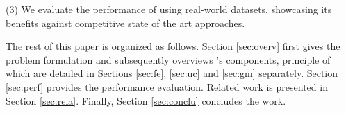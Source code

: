 \stab(3) We evaluate the performance of \sys{} using real-world datasets, showcasing its benefits against competitive state of the art approaches.



 The rest of this paper is organized as follows.
Section \ref{sec:overv} first gives the problem formulation and subsequently overviews \sys{}'s components, principle of which are detailed in Sections \ref{sec:fe}, \ref{sec:uc} and \ref{sec:gm} separately.
Section \ref{sec:perf} provides the performance evaluation.
Related work is presented in Section \ref{sec:rela}.
Finally, Section \ref{sec:conclu} concludes the work.











